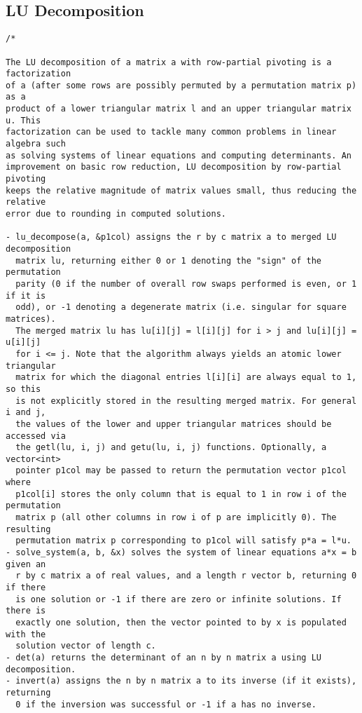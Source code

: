 \subsection{LU Decomposition}
\begin{lstlisting}
/*

The LU decomposition of a matrix a with row-partial pivoting is a factorization
of a (after some rows are possibly permuted by a permutation matrix p) as a
product of a lower triangular matrix l and an upper triangular matrix u. This
factorization can be used to tackle many common problems in linear algebra such
as solving systems of linear equations and computing determinants. An
improvement on basic row reduction, LU decomposition by row-partial pivoting
keeps the relative magnitude of matrix values small, thus reducing the relative
error due to rounding in computed solutions.

- lu_decompose(a, &p1col) assigns the r by c matrix a to merged LU decomposition
  matrix lu, returning either 0 or 1 denoting the "sign" of the permutation
  parity (0 if the number of overall row swaps performed is even, or 1 if it is
  odd), or -1 denoting a degenerate matrix (i.e. singular for square matrices).
  The merged matrix lu has lu[i][j] = l[i][j] for i > j and lu[i][j] = u[i][j]
  for i <= j. Note that the algorithm always yields an atomic lower triangular
  matrix for which the diagonal entries l[i][i] are always equal to 1, so this
  is not explicitly stored in the resulting merged matrix. For general i and j,
  the values of the lower and upper triangular matrices should be accessed via
  the getl(lu, i, j) and getu(lu, i, j) functions. Optionally, a vector<int>
  pointer p1col may be passed to return the permutation vector p1col where
  p1col[i] stores the only column that is equal to 1 in row i of the permutation
  matrix p (all other columns in row i of p are implicitly 0). The resulting
  permutation matrix p corresponding to p1col will satisfy p*a = l*u.
- solve_system(a, b, &x) solves the system of linear equations a*x = b given an
  r by c matrix a of real values, and a length r vector b, returning 0 if there
  is one solution or -1 if there are zero or infinite solutions. If there is
  exactly one solution, then the vector pointed to by x is populated with the
  solution vector of length c.
- det(a) returns the determinant of an n by n matrix a using LU decomposition.
- invert(a) assigns the n by n matrix a to its inverse (if it exists), returning
  0 if the inversion was successful or -1 if a has no inverse.


\end{lstlisting}
